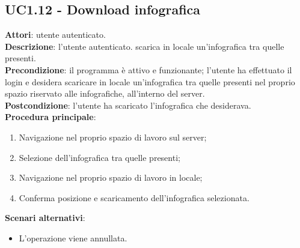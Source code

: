 \subsection{UC1.12 - Download infografica}{
	\label{uc1.12}
	\textbf{Attori}: utente autenticato.\\
	\textbf{Descrizione}: l'utente autenticato. scarica in locale un'infografica tra quelle presenti.\\
	\textbf{Precondizione}: il programma è attivo e funzionante; l'utente ha effettuato il login e desidera scaricare in locale un'infografica tra quelle presenti nel proprio spazio riservato alle infografiche, all'interno del server.	\\
	\textbf{Postcondizione}: l'utente ha scaricato l'infografica che desiderava.\\
	\textbf{Procedura principale}:
	\begin{enumerate}
		\item Navigazione nel proprio spazio di lavoro sul server;
		\item Selezione dell'infografica tra quelle presenti;
		\item Navigazione nel proprio spazio di lavoro in locale;
		\item Conferma posizione e scaricamento dell'infografica selezionata.
		\end{enumerate}	
	\textbf{Scenari alternativi}:
	\begin{itemize}
		\item L'operazione viene annullata.
	\end{itemize}
	}